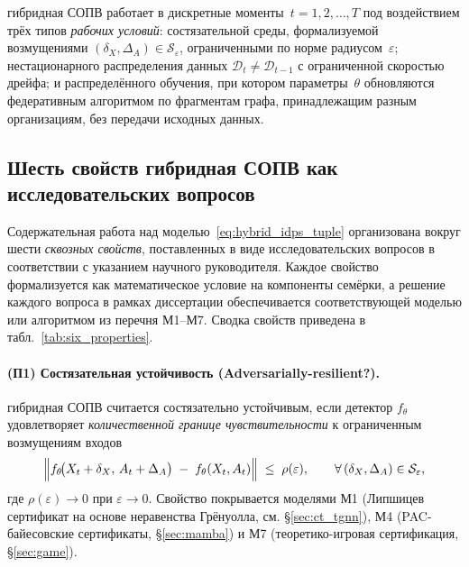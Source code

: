 гибридная СОПВ работает в дискретные моменты~$t=1,2,\dots,T$ под
воздействием трёх типов \emph{рабочих условий}: состязательной среды,
формализуемой возмущениями
$(\delta_X, \Delta_A) \in \mathcal{S}_\varepsilon$, ограниченными
по норме радиусом~$\varepsilon$; нестационарного распределения данных
$\mathcal{D}_t \neq \mathcal{D}_{t-1}$ с ограниченной скоростью дрейфа;
и распределённого обучения, при котором параметры~$\theta$ обновляются
федеративным алгоритмом по фрагментам графа, принадлежащим разным
организациям, без передачи исходных данных.

\subsection{Шесть свойств гибридная СОПВ как исследовательских вопросов}
\label{subsec:six_properties}

Содержательная работа над моделью~\eqref{eq:hybrid_idps_tuple}
организована вокруг шести \emph{сквозных свойств}, поставленных в
виде исследовательских вопросов в соответствии с указанием научного
руководителя. Каждое свойство формализуется как математическое
условие на компоненты семёрки, а решение каждого вопроса в рамках
диссертации обеспечивается соответствующей моделью или алгоритмом
из перечня М1--М7. Сводка свойств приведена в
табл.~\ref{tab:six_properties}.

\paragraph{(П1) Состязательная устойчивость (Adversarially-resilient?).}
гибридная СОПВ считается состязательно устойчивым, если детектор $f_\theta$
удовлетворяет \emph{количественной границе чувствительности} к
ограниченным возмущениям входов
\begin{equation}
\Bigl\|f_\theta\!\bigl(X_t+\delta_X,\,A_t+\Delta_A\bigr)
\;-\; f_\theta(X_t, A_t)\Bigr\|
\;\le\; \rho(\varepsilon),
\qquad \forall\,(\delta_X,\Delta_A)\in\mathcal{S}_\varepsilon,
\label{eq:adv_resilient_property}
\end{equation}
где $\rho(\varepsilon)\to 0$ при $\varepsilon\to 0$. Свойство покрывается
моделями М1 (Липшицев сертификат на основе неравенства Грёнуолла, см.
\S\ref{sec:ct_tgnn}), М4 (PAC-байесовские сертификаты,
\S\ref{sec:mamba}) и М7 (теоретико-игровая сертификация,
\S\ref{sec:game}).

